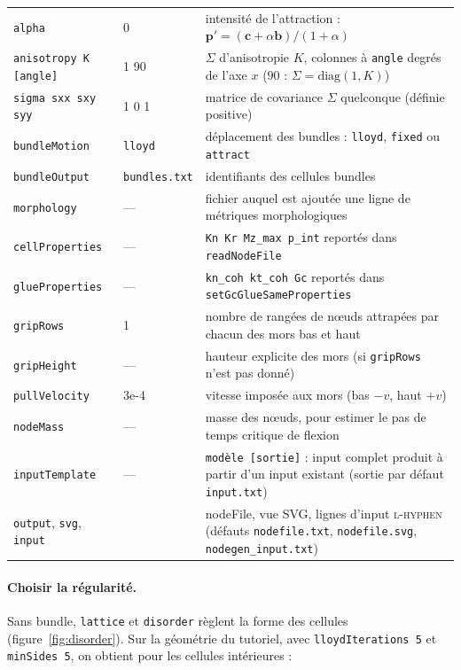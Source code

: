 \documentclass[11pt,a4paper]{article}
\newcommand{\code}[1]{\texttt{#1}}
\begin{document}
\begin{center}
\begin{tabular}{@{}llp{9.4cm}@{}}
  \code{alpha} & 0 & intensité de l'attraction : $\mathbf p'=(\mathbf c+\alpha\mathbf b)/(1+\alpha)$ \\
  \code{anisotropy K [angle]} & 1 90 & $\Sigma$ d'anisotropie $K$, colonnes à \code{angle} degrés de l'axe $x$
    ($90$ : $\Sigma=\mathrm{diag}(1,K)$) \\
  \code{sigma sxx sxy syy} & 1 0 1 & matrice de covariance $\Sigma$ quelconque (définie positive) \\
  \code{bundleMotion} & \code{lloyd} & déplacement des bundles : \code{lloyd}, \code{fixed} ou \code{attract} \\
  \code{bundleOutput} & \code{bundles.txt} & identifiants des cellules bundles \\
  \code{morphology} & --- & fichier auquel est ajoutée une ligne de métriques morphologiques \\
  \midrule
  \code{cellProperties} & --- & \code{Kn Kr Mz\_max p\_int} reportés dans \code{readNodeFile} \\
  \code{glueProperties} & --- & \code{kn\_coh kt\_coh Gc} reportés dans \code{setGcGlueSameProperties} \\
  \code{gripRows} & 1 & nombre de rangées de nœuds attrapées par chacun des mors bas et haut \\
  \code{gripHeight} & --- & hauteur explicite des mors (si \code{gripRows} n'est pas donné) \\
  \code{pullVelocity} & 3e-4 & vitesse imposée aux mors (bas $-v$, haut $+v$) \\
  \code{nodeMass} & --- & masse des nœuds, pour estimer le pas de temps critique de flexion \\
  \midrule
  \code{inputTemplate} & --- & \code{modèle [sortie]} : input complet produit à partir d'un input existant
    (sortie par défaut \code{input.txt}) \\
  \code{output}, \code{svg}, \code{input} & & nodeFile, vue SVG, lignes d'input \textsc{l-hyphen}
    (défauts \code{nodefile.txt}, \code{nodefile.svg}, \code{nodegen\_input.txt}) \\
  \bottomrule
\end{tabular}
\end{center}

\paragraph{Choisir la régularité.} Sans bundle, \code{lattice} et \code{disorder} règlent la forme des cellules
(figure~\ref{fig:disorder}). Sur la géométrie du tutoriel, avec \code{lloydIterations 5} et \code{minSides 5}, on
obtient pour les cellules intérieures :
\end{document}
